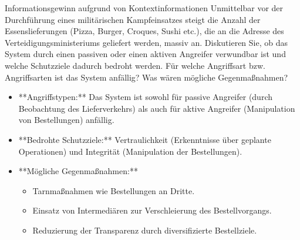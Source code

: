 \documentclass{article}
\begin{document}
\setcounter{subsection}{34}
\begin{exercise}{Informationsgewinn aufgrund von Kontextinformationen}
  Unmittelbar vor der Durchführung eines militärischen Kampfeinsatzes steigt die Anzahl der Essenslieferungen (Pizza, Burger, Croques, Sushi etc.), die an die Adresse des Verteidigungsministeriums geliefert werden, massiv an. Diskutieren Sie, ob das System durch einen passiven oder einen aktiven Angreifer verwundbar ist und welche Schutzziele dadurch bedroht werden. Für welche Angriffsart bzw. Angriffsarten ist das System anfällig? Was wären mögliche Gegenmaßnahmen?

  \begin{solution}
    \begin{itemize}
      \item **Angriffstypen:** Das System ist sowohl für passive Angreifer (durch Beobachtung des Lieferverkehrs) als auch für aktive Angreifer (Manipulation von Bestellungen) anfällig.
      \item **Bedrohte Schutzziele:** Vertraulichkeit (Erkenntnisse über geplante Operationen) und Integrität (Manipulation der Bestellungen).
      \item **Mögliche Gegenmaßnahmen:**
        \begin{itemize}
          \item Tarnmaßnahmen wie Bestellungen an Dritte.
          \item Einsatz von Intermediären zur Verschleierung des Bestellvorgangs.
          \item Reduzierung der Transparenz durch diversifizierte Bestellziele.
        \end{itemize}
    \end{itemize}
  \end{solution}
\end{exercise}
\end{document}
